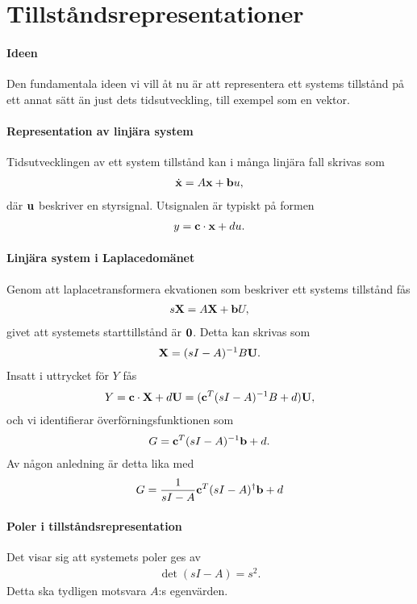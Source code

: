 \section{Tillståndsrepresentationer}

\paragraph{Ideen}
Den fundamentala ideen vi vill åt nu är att representera ett systems tillstånd på ett annat sätt än just dets tidsutveckling, till exempel som en vektor.

\paragraph{Representation av linjära system}
Tidsutvecklingen av ett system tillstånd kan i många linjära fall skrivas som
\begin{align*}
	\dot{\vb{x}} = A\vb{x} + \vb{b}u,
\end{align*}
där $\vb{u}$ beskriver en styrsignal. Utsignalen är typiskt på formen
\begin{align*}
	y = \vb{c}\cdot\vb{x} + du.
\end{align*}

\paragraph{Linjära system i Laplacedomänet}
Genom att laplacetransformera ekvationen som beskriver ett systems tillstånd fås
\begin{align*}
	s\vb{X} = A\vb{X} + \vb{b}U,
\end{align*}
givet att systemets starttillstånd är $\vb{0}$. Detta kan skrivas som
\begin{align*}
	\vb{X} = (sI - A)^{-1}B\vb{U}.
\end{align*}
Insatt i uttrycket för $Y$ fås
\begin{align*}
	Y = \vb{c}\cdot\vb{X} + d\vb{U} = (\vb{c}^{T}(sI - A)^{-1}B + d)\vb{U},
\end{align*}
och vi identifierar överförningsfunktionen som
\begin{align*}
	G = \vb{c}^{T}(sI - A)^{-1}\vb{b} + d.
\end{align*}
Av någon anledning är detta lika med
\begin{align*}
	G = \frac{1}{sI - A}\vb{c}^{T}(sI - A)^{\dagger}\vb{b} + d
\end{align*}

\paragraph{Poler i tillståndsrepresentation}
Det visar sig att systemets poler ges av
\begin{align*}
	\det(sI - A) = s^{2}.
\end{align*}
Detta ska tydligen motsvara $A$:s egenvärden.

